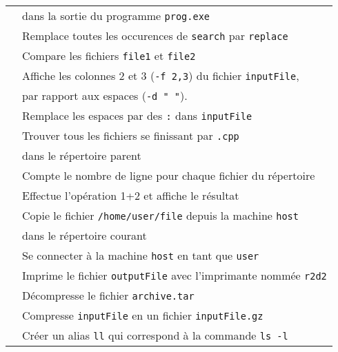 \documentclass [a4paper]{article}
\begin{document}
\begin{tabular}{ ll }
                                                          & dans la sortie du programme \verb+prog.exe+\\
\hspace{0.5cm}{\verb+sed "s/search/replace/g" inputFile+} & Remplace toutes les occurences de \verb+search+ par \verb+replace+\\
\hspace{0.5cm}{\verb+diff file1 file2+}                   & Compare les fichiers \verb+file1+ et \verb+file2+\\
\hspace{0.5cm}{\verb+cut -d " " -f 2,3 inputFile+}        & Affiche les colonnes 2 et 3 (\verb+-f 2,3+) du fichier \verb+inputFile+, \\
                                                          & par rapport aux espaces (\verb+-d " "+). \\

\hspace{0.5cm}{\verb+cat inputFile | tr " " ":"+}         & Remplace les espaces par des \verb+:+ dans \verb+inputFile+\\
\hspace{0.5cm}{\verb+find -name "*.cpp" ../+}             & Trouver tous les fichiers se finissant par \verb+.cpp+\\
                                                          & dans le répertoire parent\\
\hspace{0.5cm}{\verb+wc -l *+}                            & Compte le nombre de ligne pour chaque fichier du répertoire\\
\hspace{0.5cm}{\verb?bc <<< "1+2"?}                       & Effectue l'opération 1+2 et affiche le résultat\\
\hspace{0.5cm}{\verb?scp user@host:/home/user/file ./?}   & Copie le fichier \verb+/home/user/file+ depuis la machine \verb+host+ \\
                                                          & dans le répertoire courant \\
\hspace{0.5cm}{\verb?ssh user@host?}                      & Se connecter à la machine \verb+host+ en tant que \verb+user+\\
\hspace{0.5cm}{\verb?lpr -Pr2d2 outputFile?}              & Imprime le fichier \verb+outputFile+ avec l'imprimante nommée \verb+r2d2+\\
\hspace{0.5cm}{\verb?tar -xvf archive.tar?}               & Décompresse le fichier \verb+archive.tar+\\
\hspace{0.5cm}{\verb?gzip inputFile?}                     & Compresse \verb+inputFile+ en un fichier \verb+inputFile.gz+\\
\hspace{0.5cm}{\verb?alias ll='ls -l'?}                   & Créer un alias \verb+ll+ qui correspond à la commande \verb+ls -l+\\

\hline
\end{tabular}
\end{document}
